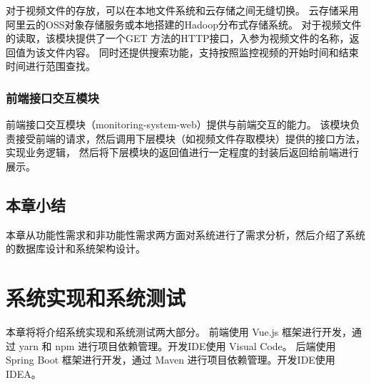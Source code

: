 对于视频文件的存放，可以在本地文件系统和云存储之间无缝切换。
云存储采用阿里云的OSS对象存储服务或本地搭建的Hadoop分布式存储系统。
对于视频文件的读取，该模块提供了一个GET 方法的HTTP接口，入参为视频文件的名称，返回值为该文件内容。
同时还提供搜索功能，支持按照监控视频的开始时间和结束时间进行范围查找。


\subsection{前端接口交互模块}
前端接口交互模块（monitoring-system-web）提供与前端交互的能力。
该模块负责接受前端的请求，然后调用下层模块（如视频文件存取模块）提供的接口方法，实现业务逻辑，
然后将下层模块的返回值进行一定程度的封装后返回给前端进行展示。






\section{本章小结}
本章从功能性需求和非功能性需求两方面对系统进行了需求分析，然后介绍了系统的数据库设计和系统架构设计。

\chapter{系统实现和系统测试}
本章将将介绍系统实现和系统测试两大部分。
前端使用 Vue.js 框架进行开发，通过 yarn 和 npm 进行项目依赖管理。开发IDE使用 Visual Code。 
后端使用 Spring Boot 框架进行开发，通过 Maven 进行项目依赖管理。开发IDE使用 IDEA。 

